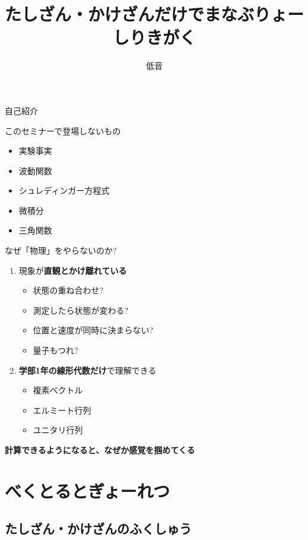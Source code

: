 \documentclass[dvipdfm]{beamer}
\title{たしざん・かけざんだけでまなぶりょーしりきがく}
\author{低音}
\begin{document}
\begin{frame}
    \titlepage
\end{frame}

\begin{frame}{自己紹介}
\end{frame}

\begin{frame}{このセミナーで登場しないもの}
    \begin{itemize}
        \item 実験事実
        \item 波動関数
        \item シュレディンガー方程式
        \item 微積分
        \item 三角関数
    \end{itemize}
\end{frame}

\begin{frame}{なぜ「物理」をやらないのか?}
    \begin{enumerate}
        \item 現象が\alert{\textbf{直観とかけ離れている}}
        \begin{itemize}
            \item 状態の重ね合わせ?
            \item 測定したら状態が変わる?
            \item 位置と速度が同時に決まらない?
            \item 量子もつれ?
        \end{itemize}
        \item \alert{\textbf{学部1年の線形代数だけ}}で理解できる
        \begin{itemize}
            \item 複素ベクトル
            \item エルミート行列
            \item ユニタリ行列
        \end{itemize}
    \end{enumerate}
    \textbf{計算できるようになると、なぜか感覚を掴めてくる}
\end{frame}



\section{べくとるとぎょーれつ}

\subsection{たしざん・かけざんのふくしゅう}
\end{document}
